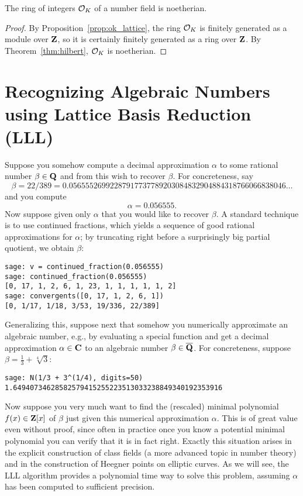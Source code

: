 \begin{corollary}\label{prop:intnoetherian}
The ring of integers $\mathcal{O}_K$ of a number field is noetherian.
\end{corollary}
\begin{proof}
By Proposition~\ref{prop:ok_lattice}, the ring $\mathcal{O}_K$ is
finitely generated as a module over $\mathbf{Z}$, so it is certainly
finitely generated as a ring over $\mathbf{Z}$.  By Theorem~\ref{thm:hilbert},
 $\mathcal{O}_K$ is noetherian.
\end{proof}


\section{Recognizing Algebraic Numbers using Lattice Basis Reduction (LLL)}\label{sec:LLL}

Suppose you somehow compute a decimal approximation $\alpha$
to some rational number $\beta \in \mathbf{Q}$ and from this wish
to recover $\beta$.  For concreteness, say
$$\beta= 22/389 = 0.05655526992287917737789203084832904884318766066838046\ldots$$
and you compute
$$
  \alpha = 0.056555.
$$
Now suppose given only $\alpha$ that you would like to recover
$\beta$.  A standard technique is to use continued fractions, which
yields a sequence of good rational approximations
for $\alpha$; by truncating right before a surprisingly big
partial quotient, we obtain $\beta$:
\begin{verbatim}
sage: v = continued_fraction(0.056555)
sage: continued_fraction(0.056555)
[0, 17, 1, 2, 6, 1, 23, 1, 1, 1, 1, 1, 2]
sage: convergents([0, 17, 1, 2, 6, 1])
[0, 1/17, 1/18, 3/53, 19/336, 22/389]
\end{verbatim}
   
Generalizing this, suppose next that somehow you numerically approximate
an algebraic number, e.g., by evaluating a special
function and get a decimal approximation $\alpha \in \mathbf{C}$
to an algebraic number $\beta \in \overline{\mathbf{Q}}$.  For concreteness,
suppose $\beta = \frac{1}{3} + \sqrt[4]{3}$:
\begin{verbatim}
sage: N(1/3 + 3^(1/4), digits=50)
1.64940734628582579415255223513033238849340192353916
\end{verbatim}
Now suppose you very much want to find the (rescaled) 
minimal polynomial $f(x) \in \mathbf{Z}[x]$
of $\beta$ just given this numerical approximation $\alpha$.
This is of great value even without proof, since often in practice
once you know a potential minimal polynomial you can
verify that it is in fact right.  Exactly this situation
arises in the explicit construction of class fields (a
more advanced topic in number theory) and in the construction
of Heegner points on elliptic curves.   As we will see, the
LLL algorithm provides a polynomial time way to solve this
problem, assuming $\alpha$ has been computed to
sufficient precision. 

